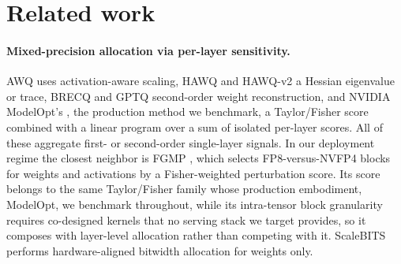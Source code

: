 
\section{Related work}\label{sec:related}

\paragraph{Mixed-precision allocation via per-layer sensitivity.} AWQ \citep{lin2024awq} uses
activation-aware scaling, HAWQ and HAWQ-v2 \citep{hawq2019,dong2020hawqv2} a Hessian eigenvalue or trace,
BRECQ \citep{li2021brecq} and GPTQ \citep{frantar2022gptq} second-order weight reconstruction, and NVIDIA
ModelOpt's  \citep{modelopt}, the production method we benchmark, a Taylor/Fisher
score combined with a linear program over a sum of isolated per-layer scores. All of these aggregate
first- or second-order single-layer signals. In our deployment regime the closest neighbor is FGMP
\citep{fgmp2025}, which selects FP8-versus-NVFP4 blocks for weights and activations by a Fisher-weighted
perturbation score. Its score belongs to the same Taylor/Fisher family whose production embodiment,
ModelOpt, we benchmark throughout, while its intra-tensor block granularity requires co-designed kernels
that no serving stack we target provides, so it composes with layer-level allocation rather than
competing with it. ScaleBITS
\citep{scalebits2026} performs hardware-aligned bitwidth allocation for weights only.

